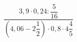 \begin{ex}[type=calculate]
	\begin{condition}
		\( \dfrac{3,9\cdot0,24:\dfrac{5}{16}}{\left( 4,06-2\dfrac{1}{2} \right)\cdot0,8\cdot4\dfrac{4}{5}} \)
	\end{condition}
	\answer{}
\end{ex}